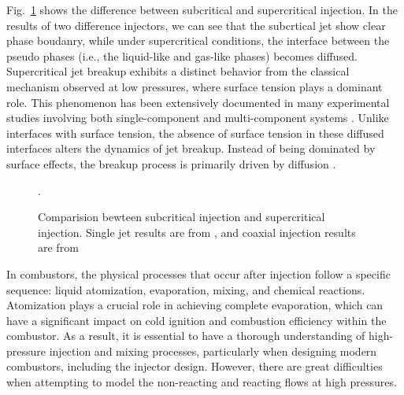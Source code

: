 Fig.~\ref{Intro_trans_exp} shows the difference between subcritical and supercritical injection. In the results of two difference injectors, we can see that the subcrtical jet show clear phase boudanry, while under supercritical conditions, the interface between the pseudo phases (i.e., the liquid-like and gas-like phases) becomes diffused. Supercritical jet breakup exhibits a distinct behavior from the classical mechanism observed at low pressures, where surface tension plays a dominant role. This phenomenon has been extensively documented in many experimental studies involving both single-component \cite{mayer1998atomization,chehroudi2002visual,candel2006structure,oschwald2006injection,roy2013disintegrating} and multi-component systems \cite{mayer1998atomization,chehroudi2002visual,candel2006structure,oschwald2006injection,roy2013disintegrating}. Unlike interfaces with surface tension, the absence of surface tension in these diffused interfaces alters the dynamics of jet breakup. Instead of being dominated by surface effects, the breakup process is primarily driven by diffusion \cite{chehroudi1999initial,smith2004fundamentals}. 


\begin{figure}[htb]
    \centering
    \caption{Comparision bewteen subcritical injection and supercritical injection. Single jet results are from \cite{chehroudi1999initial}, and coaxial injection results are from \cite{telaar2000experimental}} \label{Intro_trans_exp}. 
\end{figure}

In combustors, the physical processes that occur after injection follow a specific sequence: liquid atomization, evaporation, mixing, and chemical reactions. Atomization plays a crucial role in achieving complete evaporation, which can have a significant impact on cold ignition and combustion efficiency within the combustor. As a result, it is essential to have a thorough understanding of high-pressure injection and mixing processes, particularly when designing modern combustors, including the injector design. However, there are great difficulties when attempting to model the non-reacting and reacting flows at high pressures. 



